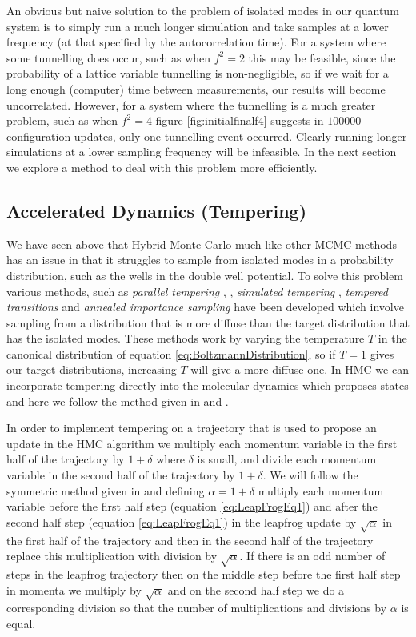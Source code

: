 \documentclass[12pt]{article}
\begin{document}
        An obvious but naive solution to the problem of isolated modes in our quantum system is to simply run a much longer simulation and take samples at a lower frequency (at that specified by the autocorrelation time). For a system where some tunnelling does occur, such as when $f^2=2$ this may be feasible, since the probability of a lattice variable tunnelling is non-negligible, so if we wait for a long enough (computer) time between measurements, our results will become uncorrelated. However, for a system where the tunnelling is a much greater problem, such as when $f^2=4$ figure \ref{fig:initialfinalf4} suggests in $100000$ configuration updates, only one tunnelling event occurred. Clearly running longer simulations at a lower sampling frequency will be infeasible. In the next section we explore a method to deal with this problem more efficiently.



    \label{sec:Tempering}
    \subsection{Accelerated Dynamics (Tempering)}
    We have seen above that Hybrid Monte Carlo much like other MCMC methods \cite{neal_2011} has an issue in that it struggles to sample from isolated modes in a probability distribution, such as the wells in the double well potential. To solve this problem various methods, such as \textit{parallel tempering} \cite{geyer_1991}, \cite{earl_deem_2005}, \textit{simulated tempering} \cite{marinari_parisi_1992}, \textit{tempered transitions} \cite{neal_1996_b} and \textit{annealed importance sampling} \cite{neal_2001} have been developed which involve sampling from a distribution that is more diffuse than the target distribution that has the isolated modes. These methods work by varying the temperature $T$ in the canonical distribution of equation \ref{eq:BoltzmannDistribution}, so if $T=1$ gives our target distributions, increasing $T$ will give a more diffuse one. In HMC we can incorporate tempering directly into the molecular dynamics which proposes states and here we follow the method given in \cite{neal_1996_b} and \cite{neal_2011}.  

    In order to implement tempering on a trajectory that is used to propose an update in the HMC algorithm we multiply each momentum variable in the first half of the trajectory by $1+\delta$ where $\delta$ is small, and divide each momentum variable in the second half of the trajectory by $1+\delta$. We will follow the symmetric method given in \cite{neal_2011} and defining $\alpha=1+\delta$ multiply each momentum variable before the first half step (equation \ref{eq:LeapFrogEq1}) and after the second half step (equation \ref{eq:LeapFrogEq1}) in the leapfrog update by $\sqrt{\alpha}$ in the first half of the trajectory and then in the second half of the trajectory replace this multiplication with division by $\sqrt{\alpha}$. If there is an odd number of steps in the leapfrog trajectory then on the middle step before the first half step in momenta we multiply by $\sqrt{\alpha}$  and on the second half step we do a corresponding division so that the number of multiplications and divisions by $\alpha$ is equal.
\end{document}
